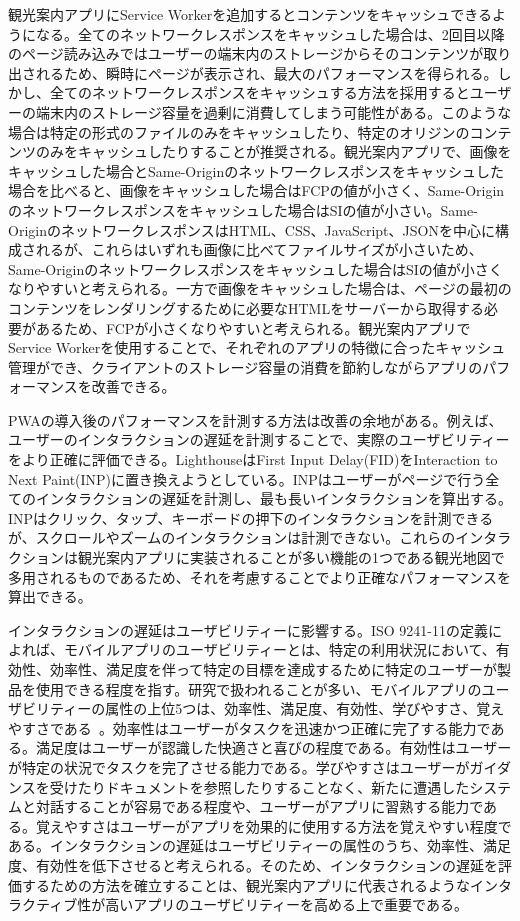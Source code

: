 観光案内アプリにService Workerを追加するとコンテンツをキャッシュできるようになる。全てのネットワークレスポンスをキャッシュした場合は、2回目以降のページ読み込みではユーザーの端末内のストレージからそのコンテンツが取り出されるため、瞬時にページが表示され、最大のパフォーマンスを得られる。しかし、全てのネットワークレスポンスをキャッシュする方法を採用するとユーザーの端末内のストレージ容量を過剰に消費してしまう可能性がある。このような場合は特定の形式のファイルのみをキャッシュしたり、特定のオリジンのコンテンツのみをキャッシュしたりすることが推奨される。観光案内アプリで、画像をキャッシュした場合とSame-Originのネットワークレスポンスをキャッシュした場合を比べると、画像をキャッシュした場合はFCPの値が小さく、Same-Originのネットワークレスポンスをキャッシュした場合はSIの値が小さい。Same-OriginのネットワークレスポンスはHTML、CSS、JavaScript、JSONを中心に構成されるが、これらはいずれも画像に比べてファイルサイズが小さいため、Same-Originのネットワークレスポンスをキャッシュした場合はSIの値が小さくなりやすいと考えられる。一方で画像をキャッシュした場合は、ページの最初のコンテンツをレンダリングするために必要なHTMLをサーバーから取得する必要があるため、FCPが小さくなりやすいと考えられる。観光案内アプリでService Workerを使用することで、それぞれのアプリの特徴に合ったキャッシュ管理ができ、クライアントのストレージ容量の消費を節約しながらアプリのパフォーマンスを改善できる。

PWAの導入後のパフォーマンスを計測する方法は改善の余地がある。例えば、ユーザーのインタラクションの遅延を計測することで、実際のユーザビリティーをより正確に評価できる。LighthouseはFirst Input Delay(FID)をInteraction to Next Paint(INP)に置き換えようとしている。INPはユーザーがページで行う全てのインタラクションの遅延を計測し、最も長いインタラクションを算出する。INPはクリック、タップ、キーボードの押下のインタラクションを計測できるが、スクロールやズームのインタラクションは計測できない。これらのインタラクションは観光案内アプリに実装されることが多い機能の1つである観光地図で多用されるものであるため、それを考慮することでより正確なパフォーマンスを算出できる。

インタラクションの遅延はユーザビリティーに影響する。ISO 9241-11の定義によれば、モバイルアプリのユーザビリティーとは、特定の利用状況において、有効性、効率性、満足度を伴って特定の目標を達成するために特定のユーザーが製品を使用できる程度を指す。研究で扱われることが多い、モバイルアプリのユーザビリティーの属性の上位5つは、効率性、満足度、有効性、学びやすさ、覚えやすさである~\cite{PawelUsabilityofMobileApplications}。効率性はユーザーがタスクを迅速かつ正確に完了する能力である。満足度はユーザーが認識した快適さと喜びの程度である。有効性はユーザーが特定の状況でタスクを完了させる能力である。学びやすさはユーザーがガイダンスを受けたりドキュメントを参照したりすることなく、新たに遭遇したシステムと対話することが容易である程度や、ユーザーがアプリに習熟する能力である。覚えやすさはユーザーがアプリを効果的に使用する方法を覚えやすい程度である。インタラクションの遅延はユーザビリティーの属性のうち、効率性、満足度、有効性を低下させると考えられる。そのため、インタラクションの遅延を評価するための方法を確立することは、観光案内アプリに代表されるようなインタラクティブ性が高いアプリのユーザビリティーを高める上で重要である。

